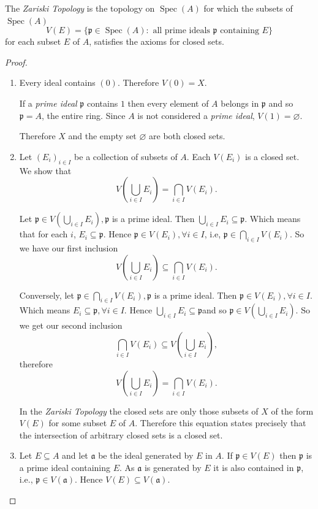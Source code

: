 \documentclass[]{report}
\DeclareMathOperator\Spec{Spec}
\begin{document}
The \textit{Zariski Topology} is the topology on $\Spec(A)$ for which the subsets of $\Spec(A)$
$$V(E) = \{\mathfrak{p}\in \Spec(A): \text{ all prime ideals } \mathfrak{p} \text{ containing } E\}$$
 for each subset $E$ of $A$, satisfies the axioms for closed sets. 
\begin{proof}
\begin{enumerate}
    \item Every ideal contains $(0)$. Therefore $V(0) = X$.

        If a \textit{prime ideal} $\mathfrak{p}$ contains $1$ then every element of $A$ belongs in $\mathfrak{p}$ and so $\mathfrak{p} = A$, the entire ring. Since $A$ is not considered a \textit{prime ideal}, $V(1) = \varnothing$. 
        
        Therefore $X$ and the empty set $\varnothing$ are both closed sets.
    \item Let $(E_i)_{i \in I}$ be a collection of subsets of $A$. Each $V(E_i)$ is a closed set. We show that 
        $$V(\bigcup_{i \in I} E_i) = \bigcap_{i \in I} V(E_i).$$

        Let $\mathfrak{p} \in V(\bigcup_{i \in I} E_i), \mathfrak{p}$ is a prime ideal. Then $\bigcup_{i \in I} E_i \subseteq \mathfrak{p}$. Which means that for each $i$, $E_i \subseteq \mathfrak{p}$. Hence $\mathfrak{p} \in V(E_i), \forall i \in I$, i.e, $\mathfrak{p} \in \bigcap_{i \in I} V(E_i)$. So we have our first inclusion
        $$V(\bigcup_{i \in I} E_i) \subseteq \bigcap_{i \in I} V(E_i).$$
        
        Conversely, let $\mathfrak{p} \in \bigcap_{i \in I} V(E_i), \mathfrak{p}$ is a prime ideal. Then $\mathfrak{p} \in V(E_i), \forall i \in I$. Which means $E_i \subseteq \mathfrak{p}, \forall i \in I$. Hence $\bigcup_{i \in I} E_i \subseteq \mathfrak{p}$and so $\mathfrak{p} \in V(\bigcup_{i \in I} E_i)$. So we get our second inclusion
        $$\bigcap_{i \in I} V(E_i) \subseteq V(\bigcup_{i \in I} E_i),$$
        therefore
        $$V(\bigcup_{i \in I} E_i) = \bigcap_{i \in I} V(E_i).$$

        In the \textit{Zariski Topology} the closed sets are only those subsets of $X$ of the form $V(E)$ for some subset $E$ of $A$. Therefore this equation states precisely that the intersection of arbitrary closed sets is a closed set.
    \item Let $E \subseteq A$ and let $\mathfrak{a}$ be the ideal generated by $E$ in $A$. If $\mathfrak{p} \in V(E)$ then $\mathfrak{p}$ is a prime ideal containing $E$. As $\mathfrak{a}$ is generated by $E$ it is also contained in $\mathfrak{p}$, i.e., $\mathfrak{p} \in V(\mathfrak{a})$. Hence $V(E) \subseteq V(\mathfrak{a})$.


\end{enumerate}
\end{proof}
\end{document}
